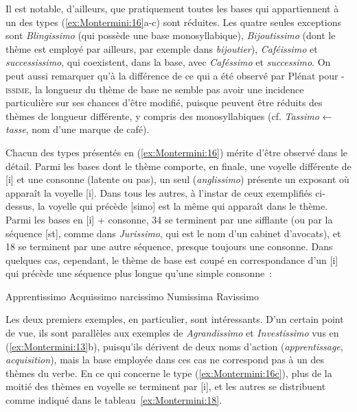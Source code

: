\documentclass[output=paper]{langsci/langscibook}
\begin{document}
Il est notable, d'ailleurs, que pratiquement toutes les bases qui
appartiennent à un des types (\ref{ex:Montermini:16}a-c) sont réduites. Les quatre seules
exceptions sont \emph{Blingissimo} (qui possède une base
monosyllabique), \emph{Bijoutissimo} (dont le thème est employé par
ailleurs, par exemple dans \emph{bijoutier}), \emph{Caféissimo} et
\emph{successissimo}, qui coexistent, dans la base, avec
\emph{Caféssimo} et \emph{successimo}. On peut aussi remarquer qu'à la
différence de ce qui a été observé par Plénat pour -\textsc{issime}, la
longueur du thème de base ne semble pas avoir une incidence particulière
sur ses chances d'être modifié, puisque peuvent être réduits des thèmes
de longueur différente, y compris des monosyllabiques (cf.
\emph{Tassimo} ← \emph{tasse}, nom d'une marque de café).

Chacun des types présentés en (\ref{ex:Montermini:16}) mérite d'être observé dans le détail.
Parmi les bases dont le thème comporte, en finale, une voyelle
différente de {[}i{]} et une consonne (latente ou pas), un seul
(\emph{anglissimo}) présente un exposant où apparaît la voyelle {[}i{]}.
Dans tous les autres, à l'instar de ceux exemplifiés ci-dessus, la
voyelle qui précède {[}simo{]} est la même qui apparaît dans le thème.
Parmi les bases en {[}i{]} + consonne, 34 se terminent par une sifflante
(ou par la séquence {[}st{]}, comme dans \emph{Jurissimo}, qui est le
nom d'un cabinet d'avocats), et 18 se terminent par une autre séquence,
presque toujours une consonne. Dans quelques cas, cependant, le thème de
base est coupé en correspondance d'un {[}i{]} qui précède une séquence
plus longue qu'une simple consonne~:

\ea \label{ex:Montermini:17}
  \ea \label{ex:Montermini:17a}{Apprentissimo }
  \ex \label{ex:Montermini:17b}{Acquissimo }
  \ex \label{ex:Montermini:17c}{narcissimo}
  \ex \label{ex:Montermini:17d}  {Numissima }
  \ex \label{ex:Montermini:17e} {Ravissimo }
\z\z


Les deux premiers exemples, en particulier, sont intéressants. D'un
certain point de vue, ils sont parallèles aux exemples de
\emph{Agrandissimo} et \emph{Investissimo} vus en (\ref{ex:Montermini:13}b), puisqu'ils
dérivent de deux noms d'action (\emph{apprentissage},
\emph{acquisition}), mais la base employée dans ces cas ne correspond
pas à un des thèmes du verbe. En ce qui concerne le type (\ref{ex:Montermini:16c}), plus de la
moitié des thèmes en voyelle se terminent par {[}i{]}, et les autres se
distribuent comme indiqué dans le tableau~\ref{ex:Montermini:18}.
\end{document}
